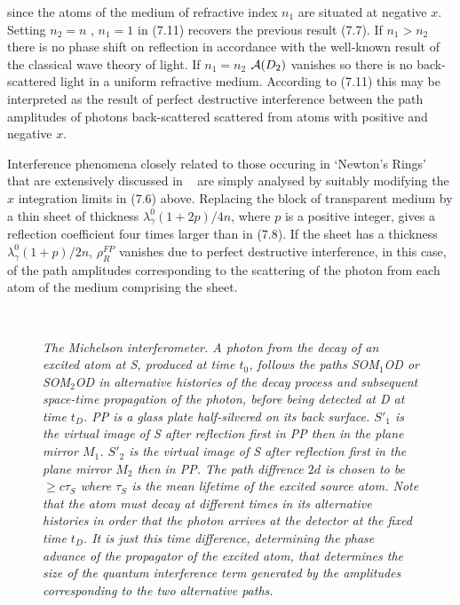 {   since the atoms of the medium of refractive index $n_1$ are situated at negative $x$.
     Setting $n_2 = n$ , $n_1 = 1$ in (7.11) recovers the previous result (7.7). If $n_1 > n_2$ there is 
    no phase shift on reflection  in accordance with the well-known result of the classical
     wave theory of light. If $n_1 = n_2$ ${\cal A}(D_2)$ vanishes so there is no back-scattered
     light in a uniform refractive medium.
      According to (7.11) this may be interpreted as the result of perfect destructive
    interference between the path amplitudes of photons  back-scattered scattered from atoms
     with positive and negative $x$.
     \par Interference phenomena closely related to those occuring in `Newton's Rings'~\cite{Newton}
      that are extensively discussed in ~\cite{Feyn1} are simply analysed
     by suitably modifying the $x$ integration limits in (7.6) above. Replacing the block of transparent
    medium by a thin sheet of thickness $\lambda_{\gamma}^0(1+2p)/4n$, where $p$ is a positive integer,
    gives a reflection coefficient  four times larger than in (7.8). If the sheet has a thickness
    $\lambda_{\gamma}^0(1+p)/2n$,  $\rho_R^{FP}$ vanishes due to perfect destructive interference, in 
    this case,
    of the path amplitudes corresponding to the scattering of the photon from each atom of the
    medium comprising the sheet.

 

\begin{figure}[htbp]
\begin{center}
\hspace*{-0.5cm}\mbox{
}
\caption{{\sl The Michelson interferometer. A photon from the decay of an excited
  atom at S, produced at time $t_0$, follows the paths SOM$_1$OD or  SOM$_2$OD in alternative histories of the decay
  process and subsequent space-time propagation of the photon, before being detected at D at time $t_D$. PP
   is a glass plate half-silvered on its back surface. $S'_1$ is the virtual image of S after reflection 
   first in PP then in the plane mirror $M_1$.  $S'_2$ is the virtual image of S after reflection 
   first in the plane mirror $M_2$ then in  PP. The path diffrence $2d$ is chosen to be $\geq c \tau_S$ where 
   $\tau_S$ is the mean lifetime of the excited source atom. Note that the atom must decay 
    at different times in its alternative histories in order that the photon arrives at the 
   detector at the fixed time $t_D$. It is just this time difference, determining the phase advance 
   of the propagator of the excited atom, that determines the size of the quantum interference
   term generated by the amplitudes corresponding to the two alternative paths. }} 
\label{fig-fig8}
\end{center}
\end{figure}

}
